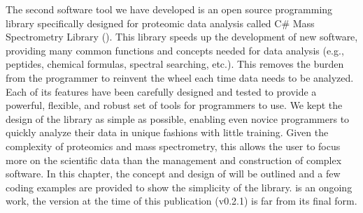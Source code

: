 The second software tool we have developed is an open source programming library specifically designed for proteomic data analysis called C\# Mass Spectrometry Library (\csmsl{}). This library speeds up the development of new software, providing many common functions and concepts needed for data analysis (e.g., peptides, chemical formulas, spectral searching, etc.). This removes the burden from the programmer to reinvent the wheel each time data needs to be analyzed. Each of its features have been carefully designed and tested to provide a powerful, flexible, and robust set of tools for programmers to use. We kept the design of the library as simple as possible, enabling even novice programmers to quickly analyze their data in unique fashions with little training. Given the complexity of proteomics and mass spectrometry, this allows the user to focus more on the scientific data than the management and construction of complex software. In this chapter, the concept and design of \csmsl{} will be outlined and a few coding examples are provided to show the simplicity of the library. \csmsl{} is an ongoing work, the version at the time of this publication (v0.2.1) is far from its final form. 

